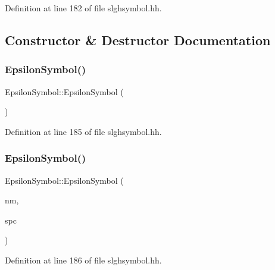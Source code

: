 Definition at line 182 of file slghsymbol.\+hh.



\subsection{Constructor \& Destructor Documentation}
\mbox{\label{class_epsilon_symbol_a6019296237a85f6ff8f4fec57f2ffcd1}} 
\subsubsection{\texorpdfstring{EpsilonSymbol()}{EpsilonSymbol()}\hspace{0.1cm}{\footnotesize\ttfamily [1/2]}}
{\footnotesize\ttfamily Epsilon\+Symbol\+::\+Epsilon\+Symbol (\begin{DoxyParamCaption}\item[{void}]{ }\end{DoxyParamCaption})\hspace{0.3cm}{\ttfamily [inline]}}



Definition at line 185 of file slghsymbol.\+hh.

\mbox{\label{class_epsilon_symbol_af987a144c16806242cae207883fc21b4}} 
\subsubsection{\texorpdfstring{EpsilonSymbol()}{EpsilonSymbol()}\hspace{0.1cm}{\footnotesize\ttfamily [2/2]}}
{\footnotesize\ttfamily Epsilon\+Symbol\+::\+Epsilon\+Symbol (\begin{DoxyParamCaption}\item[{const string \&}]{nm,  }\item[{\mbox{\hyperlink{class_addr_space}{Addr\+Space}} $\ast$}]{spc }\end{DoxyParamCaption})\hspace{0.3cm}{\ttfamily [inline]}}



Definition at line 186 of file slghsymbol.\+hh.



